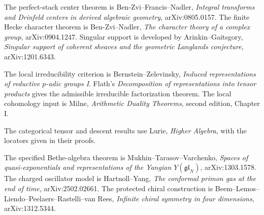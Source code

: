 The perfect-stack center theorem is Ben-Zvi--Francis--Nadler,
\emph{Integral transforms and Drinfeld centers in derived algebraic geometry},
arXiv:0805.0157.
The finite Hecke character theorem is Ben-Zvi--Nadler,
\emph{The character theory of a complex group}, arXiv:0904.1247.
Singular support is developed by Arinkin--Gaitsgory,
\emph{Singular support of coherent sheaves and the geometric
Langlands conjecture}, arXiv:1201.6343.

The local irreducibility criterion is Bernstein--Zelevinsky,
\emph{Induced representations of reductive \(p\)-adic groups I}.
Flath's \emph{Decomposition of representations into tensor products}
gives the admissible irreducible factorization theorem.
The local cohomology input is Milne,
\emph{Arithmetic Duality Theorems}, second edition, Chapter I.

The categorical tensor and descent results use Lurie,
\emph{Higher Algebra}, with the locators given in their proofs.

The specified Bethe-algebra theorem is Mukhin--Tarasov--Varchenko,
\emph{Spaces of quasi-exponentials and representations of the Yangian
\(Y(\mathfrak{gl}_N)\)}, arXiv:1303.1578.
The charged oscillator model is Hartnoll--Yang,
\emph{The conformal primon gas at the end of time}, arXiv:2502.02661.
The protected chiral construction is Beem--Lemos--Liendo--Peelaers--Rastelli--van Rees,
\emph{Infinite chiral symmetry in four dimensions}, arXiv:1312.5344.


